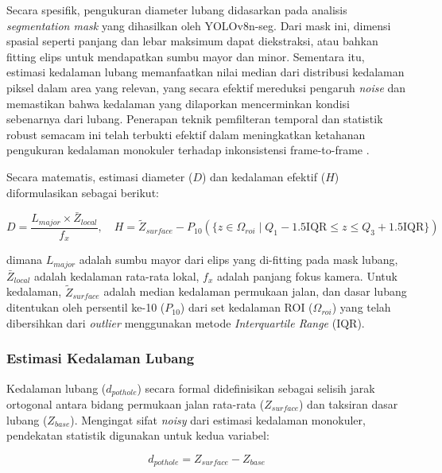 Secara spesifik, pengukuran diameter lubang didasarkan pada analisis \textit{segmentation mask} yang dihasilkan oleh YOLOv8n-seg. Dari mask ini, dimensi spasial seperti panjang dan lebar maksimum dapat diekstraksi, atau bahkan fitting elips untuk mendapatkan sumbu mayor dan minor. Sementara itu, estimasi kedalaman lubang memanfaatkan nilai median dari distribusi kedalaman piksel dalam area yang relevan, yang secara efektif mereduksi pengaruh \textit{noise} dan memastikan bahwa kedalaman yang dilaporkan mencerminkan kondisi sebenarnya dari lubang. Penerapan teknik pemfilteran temporal dan statistik robust semacam ini telah terbukti efektif dalam meningkatkan ketahanan pengukuran kedalaman monokuler terhadap inkonsistensi frame-to-frame \cite{wang2025}.

Secara matematis, estimasi diameter ($D$) dan kedalaman efektif ($H$) diformulasikan sebagai berikut:

\begin{equation}
D = \frac{L_{major} \times \bar{Z}_{local}}{f_x}, \quad H = \tilde{Z}_{surface} - P_{10}(\{z \in \Omega_{roi} \mid Q_1 - 1.5 \text{IQR} \le z \le Q_3 + 1.5 \text{IQR}\})
\end{equation}

dimana $L_{major}$ adalah sumbu mayor dari elips yang di-fitting pada mask lubang, $\bar{Z}_{local}$ adalah kedalaman rata-rata lokal, $f_x$ adalah panjang fokus kamera. Untuk kedalaman, $\tilde{Z}_{surface}$ adalah median kedalaman permukaan jalan, dan dasar lubang ditentukan oleh persentil ke-10 ($P_{10}$) dari set kedalaman ROI ($\Omega_{roi}$) yang telah dibersihkan dari \textit{outlier} menggunakan metode \textit{Interquartile Range} (IQR).


\subsubsection{Estimasi Kedalaman Lubang}
Kedalaman lubang ($d_{pothole}$) secara formal didefinisikan sebagai selisih jarak ortogonal antara bidang permukaan jalan rata-rata ($Z_{surface}$) dan taksiran dasar lubang ($Z_{base}$). Mengingat sifat \textit{noisy} dari estimasi kedalaman monokuler, pendekatan statistik digunakan untuk kedua variabel:

\begin{equation}
d_{pothole} = Z_{surface} - Z_{base}
\end{equation}


